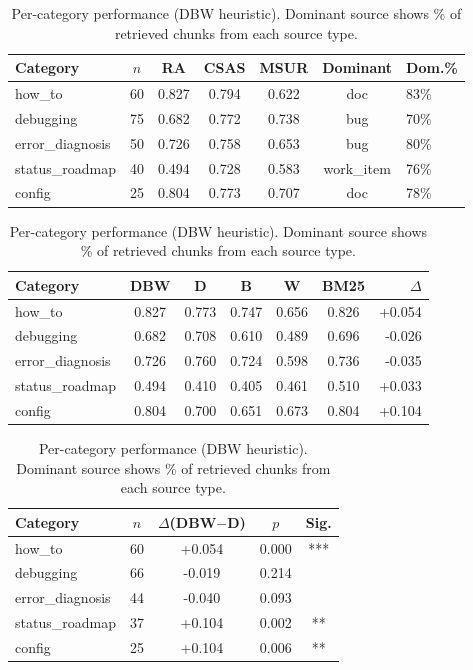 \begin{table}[t]
\caption{Per-category performance (DBW heuristic). Dominant source shows \% of
retrieved chunks from each source type.}
\label{tab:per-category}
\centering
\small
\begin{tabular}{lcccccl}
\toprule
Category & $n$ & RA & CSAS & MSUR & Dominant & Dom.\% \\
\midrule
how\_to & 60 & 0.827 & 0.794 & 0.622 & doc & 83\% \\
debugging & 75 & 0.682 & 0.772 & 0.738 & bug & 70\% \\
error\_diagnosis & 50 & 0.726 & 0.758 & 0.653 & bug & 80\% \\
status\_roadmap & 40 & 0.494 & 0.728 & 0.583 & work_item & 76\% \\
config & 25 & 0.804 & 0.773 & 0.707 & doc & 78\% \\
\bottomrule
\end{tabular}
\vspace{1em}
\begin{tabular}{lcccccr}
\toprule
Category & DBW & D & B & W & BM25 & $\Delta$ \\
\midrule
how\_to & 0.827 & 0.773 & 0.747 & 0.656 & 0.826 & +0.054 \\
debugging & 0.682 & 0.708 & 0.610 & 0.489 & 0.696 & -0.026 \\
error\_diagnosis & 0.726 & 0.760 & 0.724 & 0.598 & 0.736 & -0.035 \\
status\_roadmap & 0.494 & 0.410 & 0.405 & 0.461 & 0.510 & +0.033 \\
config & 0.804 & 0.700 & 0.651 & 0.673 & 0.804 & +0.104 \\
\bottomrule
\end{tabular}
\vspace{1em}
\begin{tabular}{lcccc}
\toprule
Category & $n$ & $\Delta$(DBW$-$D) & $p$ & Sig. \\
\midrule
how\_to & 60 & +0.054 & 0.000 & *** \\
debugging & 66 & -0.019 & 0.214 &  \\
error\_diagnosis & 44 & -0.040 & 0.093 &  \\
status\_roadmap & 37 & +0.104 & 0.002 & ** \\
config & 25 & +0.104 & 0.006 & ** \\
\bottomrule
\end{tabular}
\end{table}
